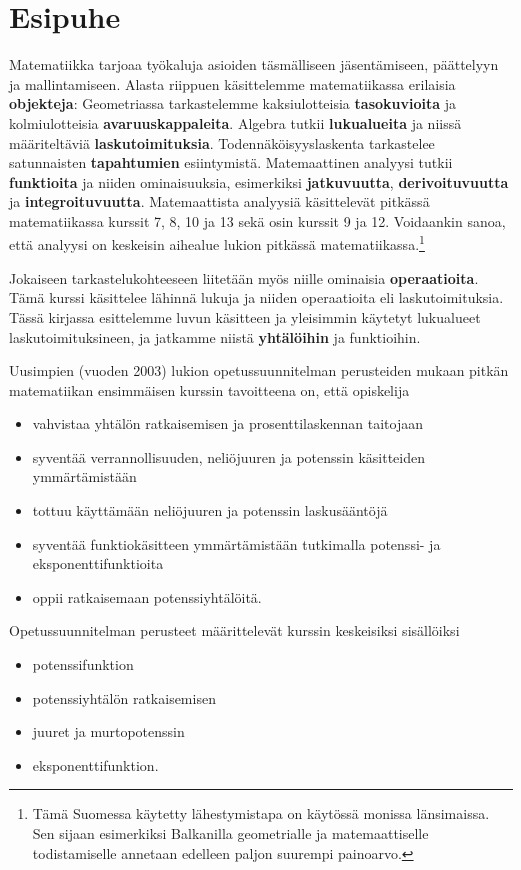 \section{Esipuhe}

Matematiikka tarjoaa työkaluja asioiden täsmälliseen jäsentämiseen, päättelyyn ja mallintamiseen. Alasta riippuen käsittelemme matematiikassa erilaisia \textbf{objekteja}: Geometriassa tarkastelemme kaksiulotteisia \textbf{tasokuvioita} ja kolmiulotteisia \textbf{avaruuskappaleita}. Algebra tutkii \textbf{lukualueita} ja niissä määriteltäviä \textbf{laskutoimituksia}. Todennäköisyyslaskenta tarkastelee satunnaisten \textbf{tapahtumien} esiintymistä. Matemaattinen analyysi tutkii \textbf{funktioita} ja niiden ominaisuuksia, esimerkiksi \textbf{jatkuvuutta}, \textbf{derivoituvuutta} ja \textbf{integroituvuutta}. Matemaattista analyysiä käsittelevät pitkässä matematiikassa kurssit 7, 8, 10 ja 13 sekä osin kurssit 9 ja 12. Voidaankin sanoa, että analyysi on keskeisin aihealue lukion pitkässä matematiikassa.\footnote[1]{Tämä Suomessa käytetty lähestymistapa on käytössä monissa länsimaissa. Sen sijaan esimerkiksi Balkanilla geometrialle ja matemaattiselle todistamiselle annetaan edelleen paljon suurempi painoarvo.}

Jokaiseen tarkastelukohteeseen liitetään myös niille ominaisia \textbf{operaatioita}. Tämä kurssi käsittelee lähinnä lukuja ja niiden operaatioita eli laskutoimituksia. Tässä kirjassa esittelemme luvun käsitteen ja yleisimmin käytetyt lukualueet laskutoimituksineen, ja jatkamme niistä \textbf{yhtälöihin} ja funktioihin.

Uusimpien (vuoden 2003) lukion opetussuunnitelman perusteiden mukaan pitkän matematiikan ensimmäisen kurssin tavoitteena on, että opiskelija
\begin{itemize}
\item vahvistaa yhtälön ratkaisemisen ja prosenttilaskennan taitojaan
\item syventää verrannollisuuden, neliöjuuren ja potenssin käsitteiden ymmärtämistään
\item tottuu käyttämään neliöjuuren ja potenssin laskusääntöjä
\item syventää funktiokäsitteen ymmärtämistään tutkimalla potenssi- ja eksponenttifunktioita
\item oppii ratkaisemaan potenssiyhtälöitä.
\end{itemize}

Opetussuunnitelman perusteet määrittelevät kurssin keskeisiksi sisällöiksi
\begin{itemize}
\item potenssifunktion
\item potenssiyhtälön ratkaisemisen
\item juuret ja murtopotenssin
\item eksponenttifunktion.
\end{itemize}
